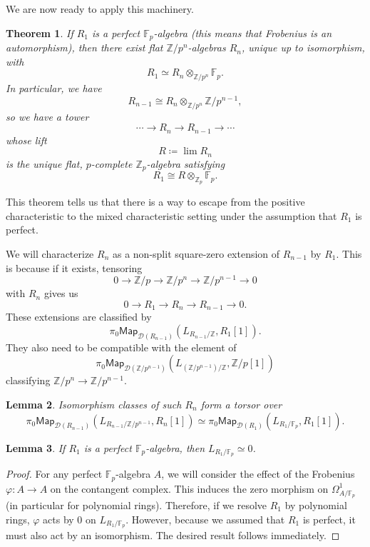 \documentclass[10pt, oneside]{memoir}
\newtheorem{thm}{Theorem}[subsection]
\newtheorem{lem}[thm]{Lemma}
\theoremstyle{definition}
\theoremstyle{remark}
\theoremstyle{plain}
\theoremstyle{definition}
\theoremstyle{remark}
\newcommand{\Z}{\mathbb{Z}}
\newcommand{\F}{\mathbb{F}}
\newcommand{\mc}[1]{\mathcal{#1}}
\newcommand{\ms}[1]{\mathsf{#1}}
\newcommand{\1}{\mathbf{1}}
\newcommand{\2}{\mathbf{2}}
\newcommand{\3}{\mathbf{3}}
\begin{document}
We are now ready to apply this machinery.
\begin{thm}\label{thm:wittvectors}
    If $R_1$ is a perfect $\F_p$-algebra (this means that Frobenius is an automorphism), then there exist flat $\Z/p^n$-algebras $R_n$, unique up to isomorphism, with 
    \[ R_1 \simeq R_n \otimes_{\Z/p^n} \F_p. \]
    In particular, we have
    \[ R_{n-1} \cong R_n \otimes_{\Z/p^n} \Z/p^{n-1}, \]
    so we have a tower
    \[ \cdots \to R_n \to R_{n-1} \to \cdots \]
    whose lift
    \[ R \coloneqq \lim R_n \]
    is the unique flat, $p$-complete $\Z_p$-algebra satisfying
    \[ R_1 \cong R \otimes_{\Z_p} \F_p. \]
\end{thm}

This theorem tells us that there is a way to escape from the positive characteristic to the mixed characteristic setting under the assumption that $R_1$ is perfect.

We will characterize $R_n$ as a non-split square-zero extension of $R_{n-1}$ by $R_1$. This is because if it exists, tensoring
\[ 0 \to \Z/p \to \Z/p^n \to \Z/p^{n-1} \to 0 \]
with $R_n$ gives us
\[ 0 \to R_1 \to R_n \to R_{n-1} \to 0. \]
These extensions are classified by
\[ \pi_0 \ms{Map}_{\mc{D}(R_{n-1})} (L_{R_{n-1}/\Z}, R_1 [1]). \]
They also need to be compatible with the element of
\[ \pi_0 \ms{Map}_{\mc{D}(\Z/p^{n-1})}(L_{(\Z/p^{n-1})/\Z}, \Z/p[1]) \]
classifying $\Z/p^n \to \Z/p^{n-1}$.

\begin{lem}
    Isomorphism classes of such $R_n$ form a torsor over
    \[ \pi_0 \ms{Map}_{\mc{D}(R_{n-1})} (L_{R_{n-1}/\Z/p^{n-1}}, R_n[1]) \simeq \pi_0 \ms{Map}_{\mc{D}(R_1)} (L_{R_1/\F_p}, R_1[1]). \]
\end{lem}

\begin{lem}
    If $R_1$ is a perfect $\F_p$-algebra, then $L_{R_1/\F_p} \simeq 0$.
\end{lem}

\begin{proof}
    For any perfect $\F_p$-algebra $A$, we will consider the effect of the Frobenius $\varphi \colon A \to A$ on the contangent complex. This induces the zero morphism on $\Omega^1_{A/\F_p}$ (in particular for polynomial rings). Therefore, if we resolve $R_1$ by polynomial rings, $\varphi$ acts by $0$ on $L_{R_1/\F_p}$. However, because we assumed that $R_1$ is perfect, it must also act by an isomorphism. The desired result follows immediately.
\end{proof}
\end{document}
